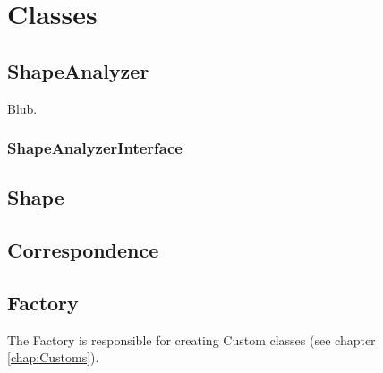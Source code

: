 
\chapter{Classes}

\section{ShapeAnalyzer}
\label{sec:ShapeAnalyzer}

Blub.

\subsection{ShapeAnalyzerInterface}
\label{subsec:ShapeAnalyzerInterface}

\section{Shape}
\label{sec:Shape}

\section{Correspondence}
\label{sec:Correspondence}

\section{Factory}
\label{sec:Factory}

The Factory is responsible for creating Custom classes (see chapter \ref{chap:Customs}). 